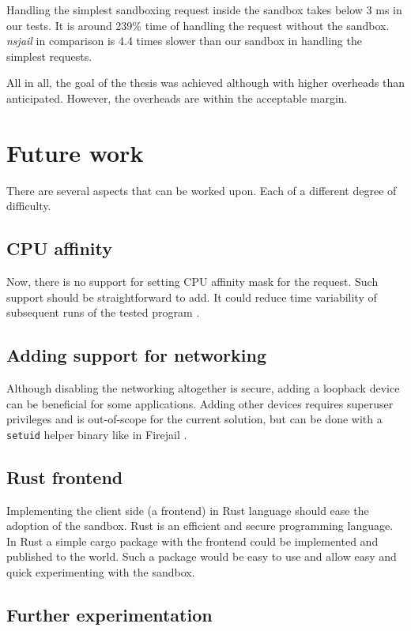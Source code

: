 \documentclass[en]{pracamgr}
\begin{document}
Handling the simplest sandboxing request inside the sandbox takes below 3 ms in our tests. It is around 239\% time of handling the request without the sandbox. \textit{nsjail} in comparison is 4.4 times slower than our sandbox in handling the simplest requests.

All in all, the goal of the thesis was achieved although with higher overheads than anticipated. However, the overheads are within the acceptable margin.

\section{Future work}\label{chapter:future_work}

There are several aspects that can be worked upon. Each of a different degree of difficulty.

\subsection{CPU affinity}

Now, there is no support for setting CPU affinity mask for the request. Such support should be straightforward to add. It could reduce time variability of subsequent runs of the tested program \cite{merry2010performance}.

\subsection{Adding support for networking}

Although disabling the networking altogether is secure, adding a loopback device can be beneficial for some applications. Adding other devices requires superuser privileges and is out-of-scope for the current solution, but can be done with a \texttt{setuid} helper binary like in Firejail \cite{netblue30/firejail}.

\subsection{Rust frontend}

Implementing the client side (a frontend) in Rust language should ease the adoption of the sandbox. Rust is an efficient and secure programming language. In Rust a simple cargo package with the frontend could be implemented and published to the world. Such a package would be easy to use and allow easy and quick experimenting with the sandbox.

\subsection{Further experimentation}
\end{document}
